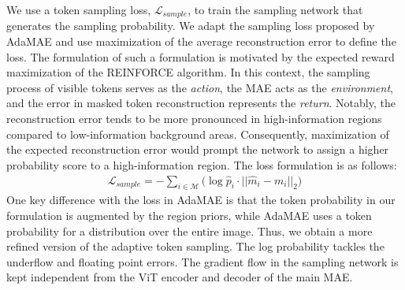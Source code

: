 %
We use a token sampling loss, $\mathcal{L}_{sample}$, to train the sampling network that generates the sampling probability. We adapt the sampling loss proposed by AdaMAE \cite{adamae} and use maximization of the average reconstruction error to define the loss. The formulation of such a formulation is motivated by the expected reward maximization of the REINFORCE algorithm. %
In this context, the sampling process of visible tokens serves as the \emph{action}, the MAE acts as the \emph{environment}, and the error in masked token reconstruction represents the \emph{return}. Notably, the reconstruction error tends to be more pronounced in high-information regions compared to low-information background areas. Consequently, maximization of the expected reconstruction error would prompt the network to assign a higher probability score to a high-information region. The loss formulation is as follows:
\begin{align}
    \mathcal{L}_{sample} = - \sum_{i\in \mathcal{M}} \big(\log{\hat{p}_i} \cdot ||\hat{m}_i - m_i||_2 \big)
\end{align}
One key difference with the loss in AdaMAE is that the token probability in our formulation is augmented by the region priors, while AdaMAE uses a token probability for a distribution over the entire image. Thus, we obtain a more refined version of the adaptive token sampling. The log probability tackles the underflow and floating point errors. The gradient flow in the sampling network is kept independent from the ViT encoder and decoder of the main MAE. 